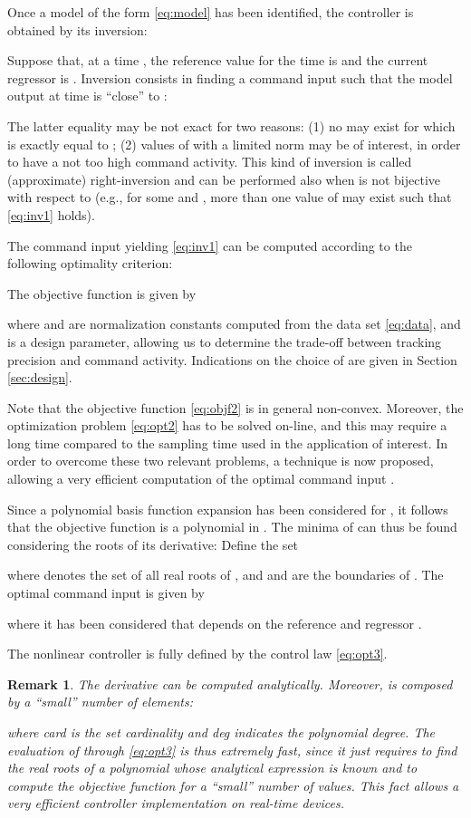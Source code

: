 \documentclass[twocolumn,english,journal]{IEEEtran}
\newtheorem{remark}{Remark}
\begin{document}
Once a model of the form \eqref{eq:model} has been identified, the
controller  is obtained by its inversion:

Suppose that, at a time , the reference value for the time 
is  and the current regressor is .
Inversion consists in finding a command input  such that
the model output at time  is ``close'' to : 

The latter equality may be not exact for two reasons: (1) no 
may exist for which  is exactly equal to ;
(2) values of  with a limited  norm may be
of interest, in order to have a not too high command activity. This
kind of inversion is called (approximate) right-inversion and can
be performed also when  is not bijective with respect to 
(e.g., for some  and , more than one
value of  may exist such that \eqref{eq:inv1} holds).

The command input  yielding \eqref{eq:inv1} can be computed
according to the following optimality criterion: 

The objective function is given by

where 
and 
are normalization constants computed from the data set \eqref{eq:data},
and  is a design parameter, allowing us to determine the
trade-off between tracking precision and command activity. Indications
on the choice of  are given in Section \ref{sec:design}.

Note that the objective function \eqref{eq:objf2} is in general non-convex.
Moreover, the optimization problem \eqref{eq:opt2} has to be solved
on-line, and this may require a long time compared to the sampling
time used in the application of interest. In order to overcome these
two relevant problems, a technique is now proposed, allowing a very
efficient computation of the optimal command input .

Since a polynomial basis function expansion has been considered for
, it follows that the objective function 
is a polynomial in . The minima of 
can thus be found considering the roots of its derivative: Define
the set

where  denotes the set of all
real roots of , and  and  are
the boundaries of . The optimal command input is given by

where it has been considered that  depends on the reference
 and regressor . 

The nonlinear controller  is fully defined by the control
law \eqref{eq:opt3}. \medskip{}


\begin{remark}\label{rem:comp}The derivative 
can be computed analytically. Moreover,  is composed by a
``small'' number of elements: 

where card is the set cardinality and deg indicates the polynomial
degree. The evaluation of  through \eqref{eq:opt3} is
thus extremely fast, since it just requires to find the real roots
of a polynomial whose analytical expression is known and to compute
the objective function for a ``small'' number of values. This fact
allows a very efficient controller implementation on real-time devices.\end{remark}\medskip{}
\end{document}
